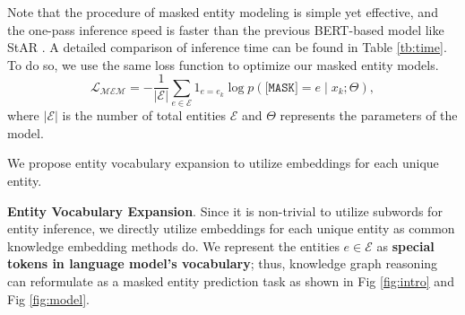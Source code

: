 \documentclass[runningheads]{llncs}
\begin{document}
\begin{table*}[thbp]
\caption{Inference efficiency comparison. $|d|$ is the length of the entity description. $|\mathcal{E}|$, $|\mathcal{R}|$ and $|\mathcal{T}|$ are the numbers of all unique entities, relations and triples in the graph respectively. Usually, $|\mathcal{E}|$ exceeds hundreds of thousands and is much greater than $|\mathcal{R}|$.}
\label{tab:results-inductive}
\centering
{}

\label{tb:time}
\end{table*} 
Note that the procedure of masked entity modeling is simple yet effective, and the one-pass inference speed is faster than the previous BERT-based model like StAR \cite{STAR}.
A detailed comparison of inference time can be found in Table \ref{tb:time}.
To do so, we use the same loss function to optimize our masked entity models.
\begin{equation}
\mathcal{L_{\text{MEM}}}=-\frac{1}{\left| \mathcal{E} \right|} \sum_{e \in \mathcal{E}} 1_{e=e_k} \log p\left(\texttt{[MASK]}=e \mid x_k ; \Theta \right),
\end{equation}
where $|\mathcal{E}|$ is the number of total entities $\mathcal{E}$ and $\Theta$ represents the parameters of the model.

We propose entity vocabulary expansion to utilize embeddings for each unique entity. 


\textbf{Entity Vocabulary Expansion}.
\label{sec:semantic-aware entity modeling}
Since it is non-trivial to utilize subwords for entity inference, we directly utilize embeddings for each unique entity as common knowledge embedding methods \cite{Bordes:TransE} do.
We represent the entities $e \in \mathcal{E}$ as \textbf{special tokens in language model's vocabulary}; thus, knowledge graph reasoning can reformulate as a masked entity prediction task as shown in Fig \ref{fig:intro} and Fig \ref{fig:model}.
\end{document}
